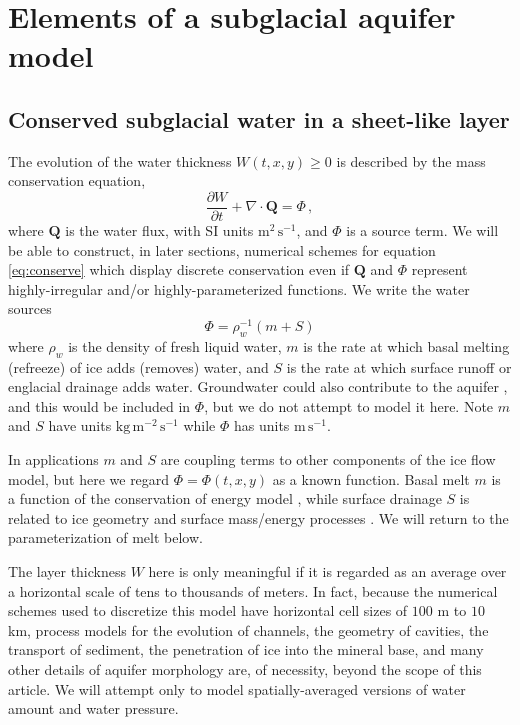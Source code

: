 \documentclass[11pt]{amsart}
\newcommand{\bQ}{\mathbf{Q}}
\begin{document}
\section{Elements of a subglacial aquifer model}

\subsection*{Conserved subglacial water in a sheet-like layer}
The evolution of the water thickness $W(t,x,y)\ge 0$ is described by the mass conservation equation,
\begin{equation} \label{eq:conserve}
\frac{\partial W}{\partial t} + \nabla \cdot \bQ = \Phi \, ,
\end{equation}
where $\bQ$ is the water flux, with SI units $\text{m}^2\,\text{s}^{-1}$, and $\Phi$ is a source term.  We will be able to construct, in later sections, numerical schemes for equation \eqref{eq:conserve} which display discrete conservation even if $\bQ$ and $\Phi$ represent highly-irregular and/or highly-parameterized functions.  We write the water sources
\begin{equation} \label{eq:watersources}
  \Phi = \rho_w^{-1} \left(m + S\right)
\end{equation}
where $\rho_w$ is the density of fresh liquid water, $m$ is the rate at which basal melting (refreeze) of ice adds (removes) water, and $S$ is the rate at which surface runoff or englacial drainage adds water.  Groundwater could also contribute to the aquifer \citep[e.g.][]{DeFooretal2011}, and this would be included in $\Phi$, but we do not attempt to model it here.  Note $m$ and $S$ have units $\text{kg}\,\text{m}^{-2}\,\text{s}^{-1}$ while $\Phi$ has units $\text{m}\,\text{s}^{-1}$.

In applications $m$ and $S$ are coupling terms to other components of the ice flow model, but here we regard $\Phi=\Phi(t,x,y)$ as a known function.  Basal melt $m$ is a function of the conservation of energy model \citep{AschwandenBuelerKhroulevBlatter}, while surface drainage $S$ is related to ice geometry and surface mass/energy processes \citep[e.g.][]{vanPeltetal}.  We will return to the parameterization of melt below.

The layer thickness $W$ here is only meaningful if it is regarded as an average over a horizontal scale of tens to thousands of meters.  In fact, because the numerical schemes used to discretize this model have horizontal cell sizes of $100$ m to $10$ km, process models for the evolution of channels, the geometry of cavities, the transport of sediment, the penetration of ice into the mineral base, and many other details of aquifer morphology are, of necessity, beyond the scope of this article.  We will attempt only to model spatially-averaged versions of water amount and water pressure.
\end{document}
